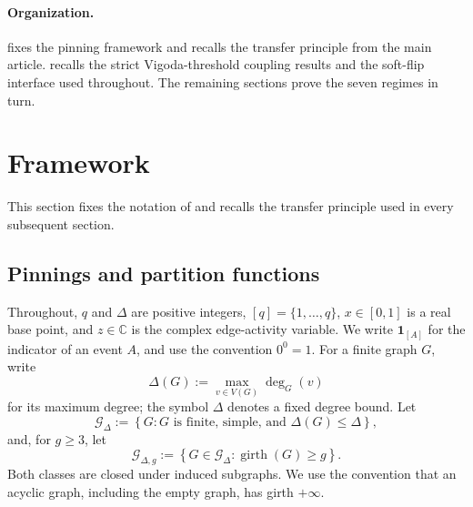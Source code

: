 \documentclass[11pt,reqno]{article}
\theoremstyle{plain}
\theoremstyle{definition}
\theoremstyle{remark}
\newcommand{\C}{\mathbb{C}}
\newcommand{\set}[1]{\left\{#1\right\}}
\newcommand{\one}[1]{\mathbf{1}_{\left[#1\right]}}   %
\newcommand{\Deg}{\Delta}                        %
\newcommand{\colours}{[q]}                        %
\newcommand{\Gdeg}{\mathcal{G}_{\Deg}}
\newcommand{\Gdegg}[1]{\mathcal{G}_{\Deg,#1}}
\begin{document}
\paragraph{Organization.}
 fixes the pinning framework and recalls the
transfer principle from the main article.
 recalls the strict Vigoda-threshold coupling
results and the soft-flip interface used throughout.
The remaining sections prove the seven regimes in turn.

\section{Framework}
\label{sec:potts-setup}

This section fixes the notation of \cite{ShaoShi2026ZeroFreeness} and recalls
the transfer principle used in every subsequent section.

\subsection{Pinnings and partition functions}

Throughout, \(q\) and \(\Deg\) are positive integers,
\(\colours=\{1,\ldots,q\}\), \(x\in[0,1]\) is a real base point, and
\(z\in\C\) is the complex edge-activity variable.  We write \(\one{A}\)
for the indicator of an event \(A\), and use the convention \(0^0=1\).
For a finite graph \(G\), write
\[
  \Delta(G):=\max_{v\in V(G)}\deg_G(v)
\]
for its maximum degree; the symbol \(\Deg\) denotes a fixed degree bound.
Let
\[
  \Gdeg:=\set{G:\text{$G$ is finite, simple, and }\Delta(G)\le\Deg},
\]
and, for \(g\ge3\), let
\[
  \Gdegg{g}:=\set{G\in\Gdeg:\operatorname{girth}(G)\ge g}.
\]
Both classes are closed under induced subgraphs.  We use the convention that
an acyclic graph, including the empty graph, has girth \(+\infty\).
\end{document}
